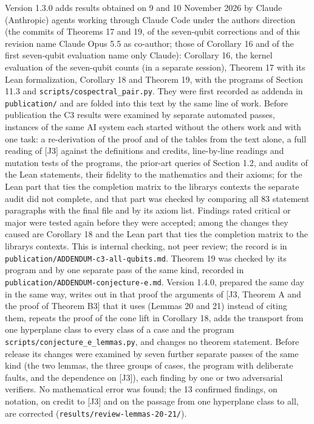 \documentclass[11pt,a4paper]{article}
\begin{document}
Version 1.3.0 adds results obtained on 9 and 10 November 2026 by Claude (Anthropic) agents working
through Claude Code under the author\textquotesingle s direction (the commits of Theorems 17 and 19, of the seven-qubit
corrections and of this revision name Claude Opus 5.5 as co-author; those of Corollary 16 and of the
first seven-qubit evaluation name only Claude): Corollary 16, the kernel evaluation of the
seven-qubit counts (in a separate session), Theorem 17 with its Lean formalization, Corollary 18 and
Theorem 19, with the programs of Section 11.3 and \nolinkurl{scripts/cospectral_pair.py}. They were first
recorded as addenda in \texttt{publication/} and are folded into this text by the same line of work. Before
publication the C3 results were examined by separate automated passes, instances of the same AI system
each started without the others\textquotesingle{} work and with one task: a re-derivation of the proof and of the
tables from the text alone, a full reading of {[}J3{]} against the definitions and credits, line-by-line
readings and mutation tests of the programs, the prior-art queries of Section 1.2, and audits of the
Lean statements, their fidelity to the mathematics and their axioms; for the Lean part that ties the
completion matrix to the library\textquotesingle s contexts the separate audit did not complete, and that part was
checked by comparing all 83 statement paragraphs with the final file and by its axiom list. Findings
rated critical or major
were tested again before they were accepted; among the changes they caused are Corollary 18 and the
Lean part that ties the completion matrix to the library\textquotesingle s contexts. This is internal checking, not
peer review; the record is in \nolinkurl{publication/ADDENDUM-c3-all-qubits.md}. Theorem 19 was checked by its
program and by one separate pass of the same kind, recorded in \nolinkurl{publication/ADDENDUM-conjecture-e.md}.
Version 1.4.0, prepared the same day in the same way, writes out in that proof the arguments of
{[}J3, Theorem A and the proof of Theorem B3{]} that it uses (Lemmas 20 and 21) instead of citing them,
repeats the proof of the cone lift in Corollary 18, adds the transport from one hyperplane class to
every class of a case and the program \nolinkurl{scripts/conjecture_e_lemmas.py}, and changes no theorem
statement. Before release its changes were examined by seven further separate passes of the same
kind (the two lemmas, the three groups of cases, the program with deliberate faults, and the
dependence on {[}J3{]}), each finding by one or two adversarial verifiers. No mathematical error was
found; the 13 confirmed findings, on notation, on credit to {[}J3{]} and on the passage from one
hyperplane class to all, are corrected (\nolinkurl{results/review-lemmas-20-21/}).
\end{document}

